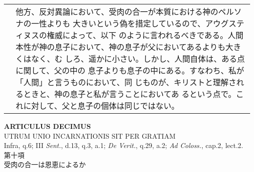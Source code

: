 \documentclass[10pt]{jsarticle} %
\begin{document}
\begin{longtable}{p{21em}p{21em}}
&

他方、反対異論において、受肉の合一が本質における神のペルソナの一性よりも
 大きいという偽を措定しているので、アウグスティヌスの権威によって、以下
 のように言われるべきである。人間
 本性が神の息子において、神の息子が父においてあるよりも大きくはなく、む
 しろ、遥かに小さい。しかし、人間自体は、ある点に関して、父の中の
 息子よりも息子の中にある。すなわち、私が「人間」と言うものにおいて、同
 じものが、キリストと理解されるときと、神の息子と私が言うことにおいてあ
 るという点で。これに対して、父と息子の個体は同じではない。


\\




\end{longtable}
\newpage




\begin{center}
 {\Large {\bf ARTICULUS DECIMUS}}\\
 {\large UTRUM UNIO INCARNATIONIS SIT PER GRATIAM}\\
 {\footnotesize Infra, q.6; III {\itshape Sent.}, d.13, q.3, a.1;
 {\itshape De Verit.}, q.29, a.2; {\itshape Ad Coloss.}, cap.2, lect.2.}\\
 {\Large 第十項\\受肉の合一は恩恵によるか}
\end{center}
\end{document}
